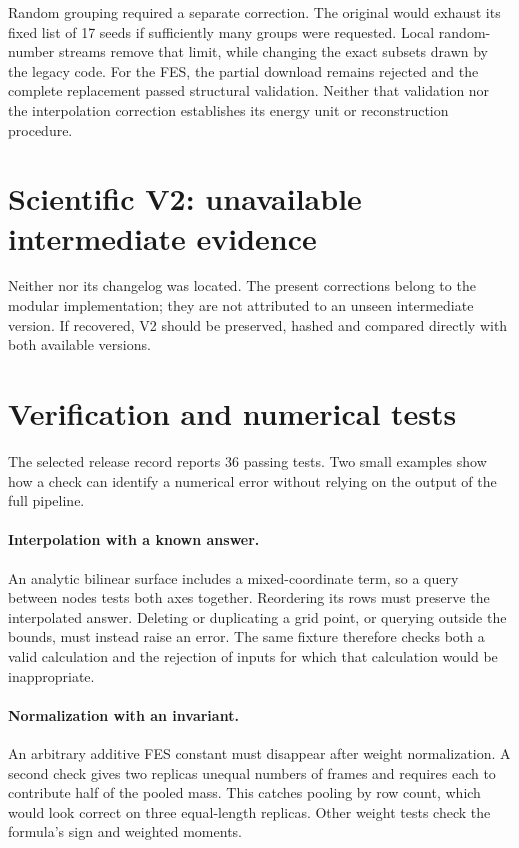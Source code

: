 Random grouping required a separate correction. The original would exhaust its fixed list of 17 seeds if sufficiently many groups were requested. Local random-number streams remove that limit, while changing the exact subsets drawn by the legacy code. For the FES, the partial download remains rejected and the complete replacement passed structural validation. Neither that validation nor the interpolation correction establishes its energy unit or reconstruction procedure.

\section{Scientific V2: unavailable intermediate evidence}
Neither  nor its changelog was located. The present corrections belong to the modular implementation; they are not attributed to an unseen intermediate version. If recovered, V2 should be preserved, hashed and compared directly with both available versions.

\section{Verification and numerical tests}
The selected release record reports 36 passing tests. Two small examples show how a check can identify a numerical error without relying on the output of the full pipeline.

\paragraph{Interpolation with a known answer.}
An analytic bilinear surface includes a mixed-coordinate term, so a query between nodes tests both axes together. Reordering its rows must preserve the interpolated answer. Deleting or duplicating a grid point, or querying outside the bounds, must instead raise an error. The same fixture therefore checks both a valid calculation and the rejection of inputs for which that calculation would be inappropriate.

\paragraph{Normalization with an invariant.}
An arbitrary additive FES constant must disappear after weight normalization. A second check gives two replicas unequal numbers of frames and requires each to contribute half of the pooled mass. This catches pooling by row count, which would look correct on three equal-length replicas. Other weight tests check the formula's sign and weighted moments.

